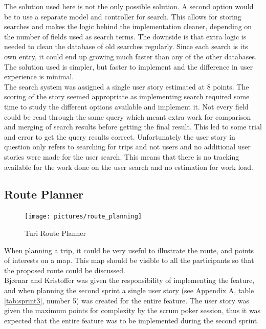 \documentclass[a4paper]{article}
\begin{document}
\noindent
The solution used here is not the only possible solution. A second option would be to use a separate model and controller for search. This allows for storing searches and makes the logic behind the implementation cleaner, depending on the number of fields used as search terms. The downside is that extra logic is needed to clean the database of old searches regularly. Since each search is its own entry, it could end up growing much faster than any of the other databases. The solution used is simpler, but faster to implement and the difference in user experience is minimal.\\

\noindent
The search system was assigned a single user story estimated at 8 points. The scoring of the story seemed appropriate as implementing search required some time to study the different options available and implement it. Not every field could be read through the same query which meant extra work for comparison and merging of search results before getting the final result. This led to some trial and error to get the query results correct. Unfortunately the user story in question only refers to searching for trips and not users and no additional user stories were made for the user search. This means that there is no tracking available for the work done on the user search and no estimation for work load.


\subsection{Route Planner}

\begin{figure}[!h]
  \begin{center}
    \texttt{[image: pictures/route\_planning]}
  \end{center}
\caption{Turi Route Planner}
\label{fig:route}
\end{figure}

\noindent
When planning a trip, it could be very useful to illustrate the route, and points of interests on a map. This map should be visible to all the participants so that the proposed route could be discussed.\\

\noindent
Bjørnar and Kristoffer was given the responsibility of implementing the feature, and when planning the second sprint a single user story (see Appendix A, table \ref{tab:sprint3}, number 5) was created for the entire feature. The user story was given the maximum points for complexity by the scrum poker session, thus it was expected that the entire feature was to be implemented during the second sprint. \\
\end{document}
